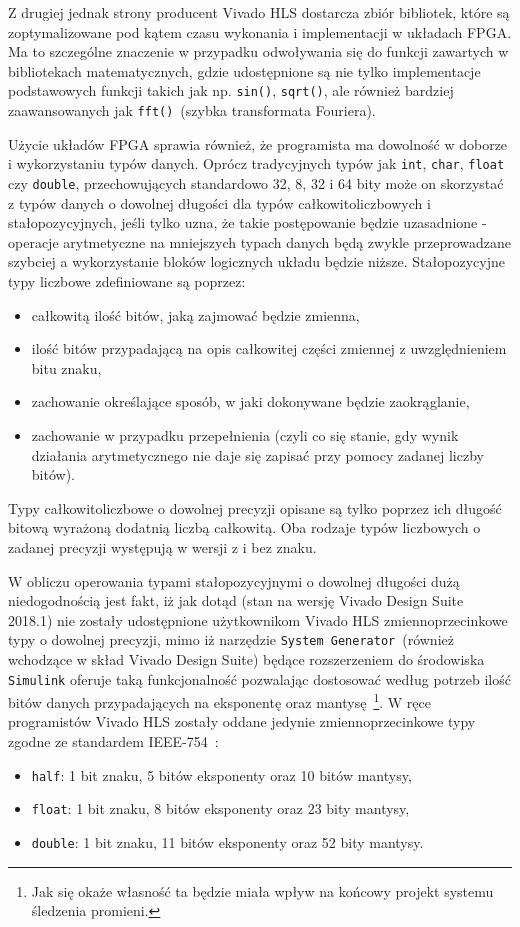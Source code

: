 Z drugiej jednak strony producent Vivado HLS dostarcza zbiór bibliotek, które są zoptymalizowane pod kątem czasu wykonania i implementacji w układach FPGA. Ma to szczególne znaczenie w przypadku odwoływania się do funkcji zawartych w bibliotekach matematycznych, gdzie udostępnione są nie tylko implementacje podstawowych funkcji takich jak np. \texttt{sin()}, \texttt{sqrt()}, ale również bardziej zaawansowanych jak \texttt{fft()}~(szybka transformata Fouriera). 

Użycie układów FPGA sprawia również, że programista ma dowolność w doborze i wykorzystaniu typów danych. Oprócz tradycyjnych typów jak \texttt{int}, \texttt{char}, \texttt{float} czy \texttt{double}, przechowujących standardowo 32, 8, 32 i 64 bity może on skorzystać z typów danych o dowolnej długości dla typów całkowitoliczbowych i stałopozycyjnych, jeśli tylko uzna, że takie postępowanie będzie uzasadnione - operacje arytmetyczne na mniejszych typach danych będą zwykle przeprowadzane szybciej a wykorzystanie bloków logicznych układu będzie niższe. Stałopozycyjne typy liczbowe zdefiniowane są poprzez:
\begin{itemize}
\item całkowitą ilość bitów, jaką zajmować będzie zmienna,
\item ilość bitów przypadającą na opis całkowitej części zmiennej z uwzględnieniem bitu znaku,
\item zachowanie określające sposób, w jaki dokonywane będzie zaokrąglanie,
\item zachowanie w przypadku przepełnienia (czyli co się stanie, gdy wynik działania arytmetycznego nie daje się zapisać przy pomocy zadanej liczby bitów).
\end{itemize}
Typy całkowitoliczbowe o dowolnej precyzji opisane są tylko poprzez ich długość bitową wyrażoną dodatnią liczbą całkowitą. Oba rodzaje typów liczbowych o zadanej precyzji występują w wersji z i bez znaku.

W obliczu operowania typami stałopozycyjnymi o dowolnej długości dużą niedogodnością jest fakt, iż jak dotąd (stan na wersję Vivado Design Suite 2018.1) nie zostały udostępnione użytkownikom Vivado HLS zmiennoprzecinkowe typy o dowolnej precyzji, mimo iż narzędzie \texttt{System Generator}~(również wchodzące w skład Vivado Design Suite) będące rozszerzeniem do środowiska \texttt{Simulink} oferuje taką funkcjonalność pozwalając dostosować według potrzeb ilość bitów danych przypadających na eksponentę oraz mantysę~\cite{Designing_with_Xilinx}\footnote{Jak się okaże własność ta będzie miała wpływ na końcowy projekt systemu śledzenia promieni.}. W ręce programistów Vivado HLS zostały oddane jedynie zmiennoprzecinkowe typy zgodne ze standardem IEEE-754~\cite{IEEE_754}:
\begin{itemize}
\item \texttt{half}: 1 bit znaku, 5 bitów eksponenty oraz 10 bitów mantysy,
\item \texttt{float}: 1 bit znaku, 8 bitów eksponenty oraz 23 bity mantysy,
\item \texttt{double}: 1 bit znaku, 11 bitów eksponenty oraz 52 bity mantysy.
\end{itemize}

